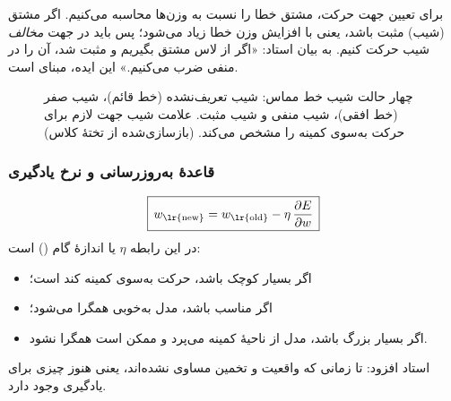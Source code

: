 برای تعیین جهت حرکت، مشتق خطا را نسبت به وزن‌ها محاسبه می‌کنیم. اگر مشتق (شیب) مثبت باشد، یعنی با افزایش وزن خطا زیاد می‌شود؛ پس باید در جهت \emph{مخالف} شیب حرکت کنیم. به بیان استاد: «اگر از لاس مشتق بگیریم و مثبت شد، آن را در منفی ضرب می‌کنیم.» این ایده، مبنای  است.

\begin{figure}[htbp]
\centering
{}
\caption{چهار حالت شیب خط مماس: شیب تعریف‌نشده (خط قائم)، شیب صفر (خط افقی)، شیب منفی و شیب مثبت. علامت شیب جهت لازم برای حرکت به‌سوی کمینه را مشخص می‌کند. (بازسازی‌شده از تختهٔ کلاس)}
\end{figure}

\subsubsection{قاعدهٔ به‌روزرسانی و نرخ یادگیری}
\[
\boxed{\,w_{\text{\lr{new}}}=w_{\text{\lr{old}}}-\eta\,\frac{\partial E}{\partial w}\,}
\]
در این رابطه $\eta$  یا اندازهٔ گام () است:
\begin{itemize}
  \item اگر بسیار کوچک باشد، حرکت به‌سوی کمینه کند است؛
  \item اگر مناسب باشد، مدل به‌خوبی همگرا می‌شود؛
  \item اگر بسیار بزرگ باشد، مدل از ناحیهٔ کمینه می‌پرد و ممکن است همگرا نشود.
\end{itemize}
استاد افزود: تا زمانی که واقعیت و تخمین مساوی نشده‌اند، یعنی هنوز چیزی برای یادگیری وجود دارد.

